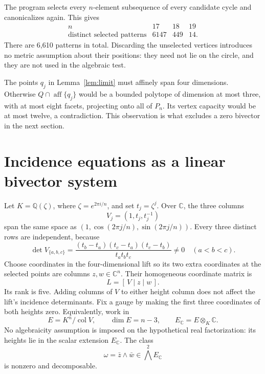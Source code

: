 \documentclass[11pt]{article}
\theoremstyle{definition}
\newcommand{\aff}{\operatorname{aff}}
\newcommand{\C}{\mathbb C}
\newcommand{\Q}{\mathbb Q}
\begin{document}
The program selects every $n$-element subsequence of every candidate cycle and canonicalizes again. This gives
\begin{equation}\label{eq:patterns}
 \begin{array}{c|rrr}
 n&17&18&19\\\hline
 \text{distinct selected patterns}&6147&449&14.
 \end{array}
\end{equation}
There are 6,610 patterns in total. Discarding the unselected vertices introduces no metric assumption about their positions: they need not lie on the circle, and they are not used in the algebraic test.

The points $q_j$ in Lemma~\ref{lem:limit} must affinely span four dimensions. Otherwise $Q\cap\aff\{q_j\}$ would be a bounded polytope of dimension at most three, with at most eight facets, projecting onto all of $P_n$. Its vertex capacity would be at most twelve, a contradiction. This observation is what excludes a zero bivector in the next section.

\section{Incidence equations as a linear bivector system}
Let $K=\Q(\zeta)$, where $\zeta=e^{2\pi i/n}$, and set $t_j=\zeta^j$. Over $\C$, the three columns
\[
 V_j=(1,t_j,t_j^{-1})
\]
span the same space as $(1,\cos(2\pi j/n),\sin(2\pi j/n))$. Every three distinct rows are independent, because
\begin{equation}\label{eq:vander}
 \det V_{\{a,b,c\}}
 =\frac{(t_b-t_a)(t_c-t_a)(t_c-t_b)}{t_at_bt_c}\ne0
 \quad(a<b<c).
\end{equation}
Choose coordinates in the four-dimensional lift so its two extra coordinates at the selected points are columns $z,w\in\C^n$. Their homogeneous coordinate matrix is
\[
 L=[\,V\mid z\mid w\,].
\]
Its rank is five. Adding columns of $V$ to either height column does not affect the lift's incidence determinants. Fix a gauge by making the first three coordinates of both heights zero. Equivalently, work in
\[
 E=K^n/\operatorname{col}V,\qquad \dim E=n-3,\qquad E_{\C}=E\otimes_K\C.
\]
No algebraicity assumption is imposed on the hypothetical real factorization: its heights lie in the scalar extension $E_{\C}$. The class
\begin{equation}\label{eq:omega}
 \omega=\bar z\wedge\bar w\in\bigwedge^2 E_{\C}
\end{equation}
is nonzero and decomposable.
\end{document}
